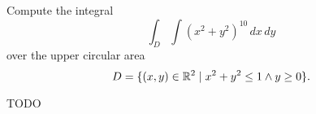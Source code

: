 \begin{exercise}
	Compute the integral
	$$
		\int_D \int (x^2 + y^2)^{10} \, dx \, dy
	$$
	over the upper circular area
	$$
		D = \{(x,y) \in \mathbb{R}^2 \mid x^2 + y^2 \leq 1 \wedge y \geq 0 \}.
	$$
\end{exercise}

\begin{solution}
	TODO
\end{solution}
